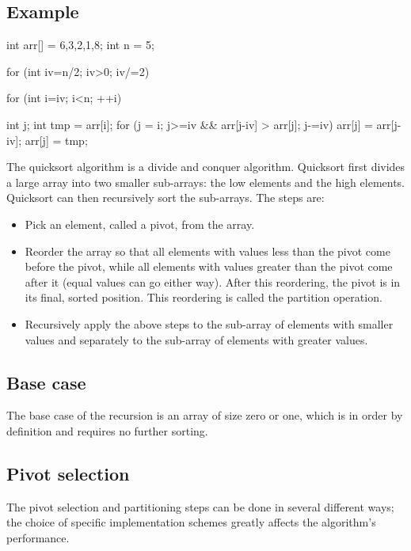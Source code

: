 \documentclass{report}
\begin{document}
    \subsection{Example}
    \bigbreak \noindent 
    \begin{cppcode}
    int arr[] = {6,3,2,1,8};
    int n = 5;

    for (int iv=n/2; iv>0; iv/=2) {

        for (int i=iv; i<n; ++i) {

            int j;
            int tmp = arr[i];
            for (j = i; j>=iv && arr[j-iv] > arr[j]; j-=iv) {
                arr[j] = arr[j-iv];
            }
            arr[j] = tmp;
        }
    }
    \end{cppcode}

    \pagebreak 
    \bigbreak \noindent 
    \begin{concept}
        The quicksort algorithm is a divide and conquer algorithm. Quicksort first divides a large array into two smaller sub-arrays: the low elements and the high elements. Quicksort can then recursively sort the sub-arrays. The steps are:
    \end{concept}
    \begin{itemize}
        \item Pick an element, called a pivot, from the array.
        \item Reorder the array so that all elements with values less than the pivot come before the pivot, while all elements with values greater than the pivot come after it (equal values can go either way). After this reordering, the pivot is in its final, sorted position. This reordering is called the partition operation.
        \item Recursively apply the above steps to the sub-array of elements with smaller values and separately to the sub-array of elements with greater values.
    \end{itemize}
    \bigbreak \noindent 
    \subsection{Base case}
    \bigbreak \noindent 
    The base case of the recursion is an array of size zero or one, which is in order by definition and requires no further sorting.
    \bigbreak \noindent 
    \subsection{Pivot selection}
    \bigbreak \noindent The pivot selection and partitioning steps can be done in several different ways; the choice of specific implementation schemes greatly affects the algorithm's performance.
\end{document}
